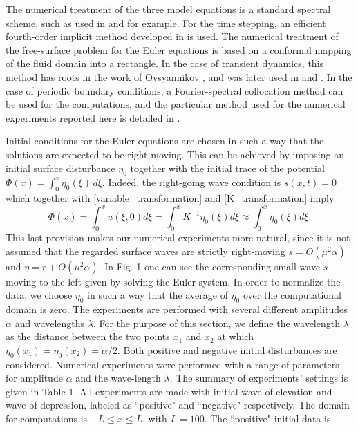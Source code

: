 The numerical treatment of the three model equations is a standard spectral scheme,
such as used in \cite{Fornberg1978} and \cite{Ehrnstrom2013} for example. For the time stepping,
an efficient fourth-order implicit method developed in \cite{DeFrutos1992} is used. 
The numerical treatment of the free-surface problem for the Euler equations
is based on a conformal mapping of the fluid domain into a rectangle. 
In the case of transient dynamics, this method has roots
in the work of Ovsyannikov \cite{Ovsyannikov1974}, 
and was later used in \cite{Dyachenko1996} and \cite{Li2004}.
In the case of periodic
boundary conditions, a Fourier-spectral collocation method can be used
for the computations, and the particular method used for the numerical experiments
reported here is detailed in \cite{Mitsotakis2014}.

Initial conditions for the Euler equations are chosen in such a way that 
the solutions are expected to be right moving.
This can be achieved by
imposing an initial surface disturbance $\eta_0$ together with the initial
trace of the potential
\(
	\Phi(x) = \int_0^x \eta_0(\xi) \, d\xi
	.
\)
Indeed, the right-going wave condition is $s(x,t) = 0$ which together with
\eqref{variable_transformation} and \eqref{K_transformation} imply
%
\[
	\Phi(x) = \int_0^x u(\xi, 0) d\xi
	= \int_0^x K^{-1} \eta_0 (\xi) d\xi
	\approx \int_0^x \eta_0 (\xi) d\xi
	.
\]
%
This last provision makes our numerical experiments more natural,
since it is not assumed that the regarded surface waves are
strictly right-moving $s = O(\mu^2 \alpha)$ and $\eta = r + O(\mu^2 \alpha)$.
In Fig. 1 one can see the corresponding small
wave $s$ moving to the left given by solving the Euler system.
In order to normalize the data, we choose $\eta_0$ in such a way that
the average of $\eta_0$ over the computational domain is zero.
The experiments are performed with
several different amplitudes $\alpha$ and wavelengths $\lambda$.
For the purpose of this section, we define the 
wavelength $\lambda$ as the distance between 
the two points $x_1$ and $x_2$ at which $\eta_0(x_1) = \eta_0(x_2) = \alpha /2$.
Both positive and negative initial disturbances are considered.
Numerical experiments were performed with a range of parameters
for amplitude $\alpha$ and the wave-length $\lambda$.
The summary of experiments' settings is given in Table 1.
All experiments are made with initial wave of elevation and wave of depression, labeled as ``positive" and ``negative" respectively.
The domain for computations is $-L\leq x \leq L$, with $L = 100$. 
The ``positive" initial data is
